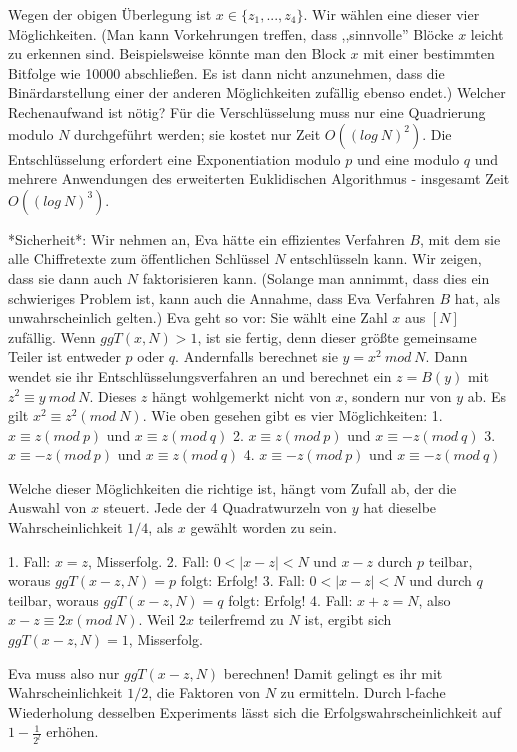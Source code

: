 \documentclass[a4paper]{article}
\begin{document}
\begin{multicols}{3}
        Wegen der obigen Überlegung ist $x\in\{z_1,...,z_4\}$. Wir wählen eine dieser vier Möglichkeiten. (Man kann Vorkehrungen treffen, dass ,,sinnvolle'' Blöcke $x$ leicht zu erkennen sind. Beispielsweise könnte man den Block $x$ mit einer bestimmten Bitfolge wie 10000 abschließen. Es ist dann nicht anzunehmen, dass die Binärdarstellung einer der anderen Möglichkeiten zufällig ebenso endet.)
        Welcher Rechenaufwand ist nötig? Für die Verschlüsselung muss nur eine Quadrierung modulo $N$ durchgeführt werden; sie kostet nur Zeit $O((log\ N)^2)$. Die Entschlüsselung erfordert eine Exponentiation modulo $p$ und eine modulo $q$ und mehrere Anwendungen des erweiterten Euklidischen Algorithmus - insgesamt Zeit $O((log\ N)^3)$.

        *Sicherheit*: Wir nehmen an, Eva hätte ein effizientes Verfahren $B$, mit dem sie alle Chiffretexte zum öffentlichen Schlüssel $N$ entschlüsseln kann. Wir zeigen, dass sie dann auch $N$ faktorisieren kann. (Solange man annimmt, dass dies ein schwieriges Problem ist, kann auch die Annahme, dass Eva Verfahren $B$ hat, als unwahrscheinlich gelten.)
        Eva geht so vor: Sie wählt eine Zahl $x$ aus $[N]$ zufällig. Wenn $ggT(x,N)>1$, ist sie fertig, denn dieser größte gemeinsame Teiler ist entweder $p$ oder $q$. Andernfalls berechnet sie $y=x^2\ mod\ N$. Dann wendet sie ihr Entschlüsselungsverfahren an und berechnet ein $z=B(y)$ mit $z^2 \equiv y\ mod\ N$. Dieses $z$ hängt wohlgemerkt nicht von $x$, sondern nur von $y$ ab. Es gilt $x^2\equiv z^2
    (mod\ N)$. Wie oben gesehen gibt es vier Möglichkeiten:
        1. $x\equiv z (mod\ p)$ und $x\equiv z (mod\ q)$
        2. $x\equiv z (mod\ p)$ und $x\equiv -z (mod\ q)$
        3. $x\equiv -z (mod\ p)$ und $x\equiv z (mod\ q)$
        4. $x\equiv -z (mod\ p)$ und $x\equiv -z (mod\ q)$

        Welche dieser Möglichkeiten die richtige ist, hängt vom Zufall ab, der die Auswahl von $x$ steuert. Jede der 4 Quadratwurzeln von $y$ hat dieselbe Wahrscheinlichkeit $1/4$, als $x$ gewählt worden zu sein.

        1. Fall: $x=z$, Misserfolg.
        2. Fall: $0<|x-z|< N$ und $x-z$ durch $p$ teilbar, woraus $ggT(x-z,N) =p$ folgt: Erfolg!
        3. Fall: $0<|x-z|< N$ und durch $q$ teilbar, woraus $ggT(x-z,N) =q$ folgt: Erfolg!
        4. Fall: $x+z=N$, also $x-z\equiv 2x(mod\ N)$. Weil $2x$ teilerfremd zu $N$ ist, ergibt sich $ggT(x-z,N)=1$, Misserfolg.

        Eva muss also nur $ggT(x-z,N)$ berechnen! Damit gelingt es ihr mit Wahrscheinlichkeit $1/2$, die Faktoren von $N$ zu ermitteln. Durch l-fache Wiederholung desselben Experiments lässt sich die Erfolgswahrscheinlichkeit auf $1-\frac{1}{2^l}$ erhöhen.


\end{multicols}
\end{document}
